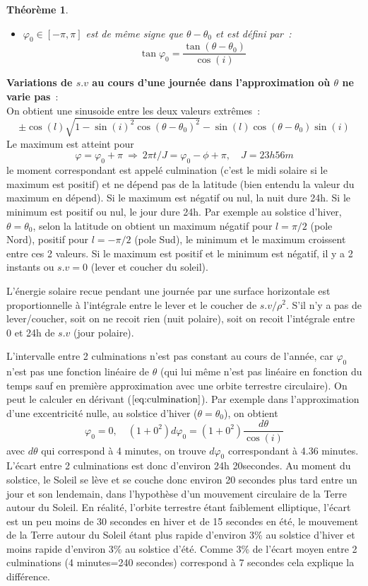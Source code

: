 \documentclass[a4paper,11pt]{book}
\newtheorem{thm}{Théorème}
\begin{document}
\begin{giacjshere}
\begin{thm}
\begin{itemize}
de la rotation de la Terre (somme de la longitude g\'eographique $\phi$ et 
du terme d\'ependant du temps $2\pi t/J$)
\item  $\varphi_0 \in [-\pi,\pi]$ est de m\^eme signe que $\theta-\theta_0$
et est d\'efini par~:
\begin{equation} \label{eq:culmination}
\tan \varphi_0 = \frac{\tan(\theta-\theta_0)}{\cos(i)} 
\end{equation}
\end{itemize}
\end{thm}
{\bf Variations de $s.v$ au cours d'une journ\'ee dans l'approximation o\`u
$\theta$ ne varie pas}~:\\
On obtient une sinusoide entre les deux valeurs extr\^emes~:
\[ \pm \cos(l) \sqrt{1 - \sin(i)^2 \cos(\theta-\theta_0)^2 } -
 \sin(l) \cos(\theta-\theta_0)\sin(i) \]
Le maximum est atteint pour 
\[ \varphi=\varphi_0+ \pi \ \Rightarrow \ 
2 \pi t/J = \varphi_0 - \phi + \pi, \quad J=23h56m \]
le moment correspondant est appel\'e culmination (c'est le midi
solaire si le maximum est positif) et ne d\'epend pas de la latitude
(bien entendu la valeur du maximum en d\'epend).
Si le maximum est n\'egatif ou nul, la nuit dure 24h.
Si le minimum est positif ou nul, le jour dure 24h.
Par exemple au solstice d'hiver, $\theta=\theta_0$, selon la latitude
on obtient un maximum n\'egatif pour $l=\pi/2$ (pole Nord), positif 
pour $l=-\pi/2$ (pole Sud), le minimum et le maximum croissent 
entre ces 2 valeurs.
Si le maximum est positif et le minimum est n\'egatif, il y a
2 instants ou $s.v=0$ (lever et coucher du soleil).

L'\'energie solaire recue pendant une journ\'ee par une surface
horizontale est proportionnelle \`a l'int\'egrale entre le lever
et le coucher de $s.v/\rho^2$. S'il n'y a pas de lever/coucher, 
soit on ne recoit rien (nuit polaire),
soit on recoit l'int\'egrale entre 0 et 24h de $s.v$ (jour polaire).

L'intervalle entre 2 culminations n'est pas constant au cours de
l'ann\'ee, car $\varphi_0$ n'est pas une fonction lin\'eaire de
$\theta$ (qui lui m\^eme n'est pas lin\'eaire en fonction du temps
sauf en premi\`ere approximation avec une orbite terrestre
circulaire). On peut le calculer en d\'erivant (\(\ref{eq:culmination}\)).
Par exemple dans l'approximation d'une excentricit\'e nulle,
au solstice d'hiver ($\theta=\theta_0$), on obtient
\[ \varphi_0= 0, \quad (1+0^2) d\varphi_0 = (1+0^2)\frac{d\theta} {\cos(i)} \]
avec $d\theta$ qui correspond \`a 4 minutes, on trouve $d\varphi_0$
correspondant \`a 4.36 minutes.
L'\'ecart entre 2 culminations
est donc d'environ 24h 20secondes. 
Au moment du solstice, le Soleil se l\`eve et se couche donc environ
20 secondes plus tard entre un jour et son lendemain, dans 
l'hypothèse d'un mouvement circulaire de la Terre autour du Soleil. 
En réalité, l'orbite terrestre étant faiblement elliptique,
l'écart est un peu moins de 30 secondes en hiver et de 15 secondes en été, 
le mouvement de la Terre autour du Soleil étant plus rapide d'environ
3\% au solstice d'hiver et moins rapide d'environ 3\% au
solstice d'été. Comme 3\%
de l'écart moyen entre 2 culminations (4 minutes=240 secondes) 
correspond à 7 secondes cela explique la différence.


\end{giacjshere}
\end{document}
